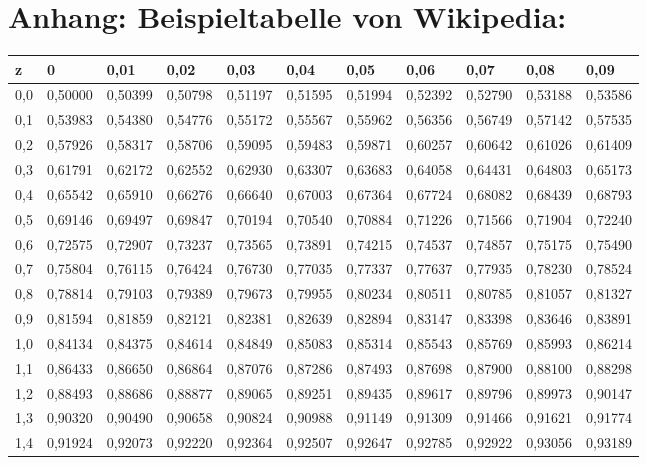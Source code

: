 \documentclass[12pt,a4paper,twocolumn]{article}
\begin{document}
\section*{Anhang: Beispieltabelle von Wikipedia:}
\begin{tabular}{l|l|l|l|l|l|l|l|l|l|l}
z & 0 & 0,01 & 0,02 & 0,03 & 0,04 & 0,05 & 0,06 & 0,07 & 0,08 & 0,09\\ \hline
0,0 & 0,50000 & 0,50399 & 0,50798 & 0,51197 & 0,51595 & 0,51994 & 0,52392 & 0,52790 & 0,53188 & 0,53586\\ \hline
0,1 & 0,53983 & 0,54380 & 0,54776 & 0,55172 & 0,55567 & 0,55962 & 0,56356 & 0,56749 & 0,57142 & 0,57535\\ \hline
0,2 & 0,57926 & 0,58317 & 0,58706 & 0,59095 & 0,59483 & 0,59871 & 0,60257 & 0,60642 & 0,61026 & 0,61409\\ \hline
0,3 & 0,61791 & 0,62172 & 0,62552 & 0,62930 & 0,63307 & 0,63683 & 0,64058 & 0,64431 & 0,64803 & 0,65173\\ \hline
0,4 & 0,65542 & 0,65910 & 0,66276 & 0,66640 & 0,67003 & 0,67364 & 0,67724 & 0,68082 & 0,68439 & 0,68793\\ \hline
0,5 & 0,69146 & 0,69497 & 0,69847 & 0,70194 & 0,70540 & 0,70884 & 0,71226 & 0,71566 & 0,71904 & 0,72240\\ \hline
0,6 & 0,72575 & 0,72907 & 0,73237 & 0,73565 & 0,73891 & 0,74215 & 0,74537 & 0,74857 & 0,75175 & 0,75490\\ \hline
0,7 & 0,75804 & 0,76115 & 0,76424 & 0,76730 & 0,77035 & 0,77337 & 0,77637 & 0,77935 & 0,78230 & 0,78524\\ \hline
0,8 & 0,78814 & 0,79103 & 0,79389 & 0,79673 & 0,79955 & 0,80234 & 0,80511 & 0,80785 & 0,81057 & 0,81327\\ \hline
0,9 & 0,81594 & 0,81859 & 0,82121 & 0,82381 & 0,82639 & 0,82894 & 0,83147 & 0,83398 & 0,83646 & 0,83891\\ \hline
1,0 & 0,84134 & 0,84375 & 0,84614 & 0,84849 & 0,85083 & 0,85314 & 0,85543 & 0,85769 & 0,85993 & 0,86214\\ \hline
1,1 & 0,86433 & 0,86650 & 0,86864 & 0,87076 & 0,87286 & 0,87493 & 0,87698 & 0,87900 & 0,88100 & 0,88298\\ \hline
1,2 & 0,88493 & 0,88686 & 0,88877 & 0,89065 & 0,89251 & 0,89435 & 0,89617 & 0,89796 & 0,89973 & 0,90147\\ \hline
1,3 & 0,90320 & 0,90490 & 0,90658 & 0,90824 & 0,90988 & 0,91149 & 0,91309 & 0,91466 & 0,91621 & 0,91774\\ \hline
1,4 & 0,91924 & 0,92073 & 0,92220 & 0,92364 & 0,92507 & 0,92647 & 0,92785 & 0,92922 & 0,93056 & 0,93189\\ \hline

\end{tabular}
\end{document}

